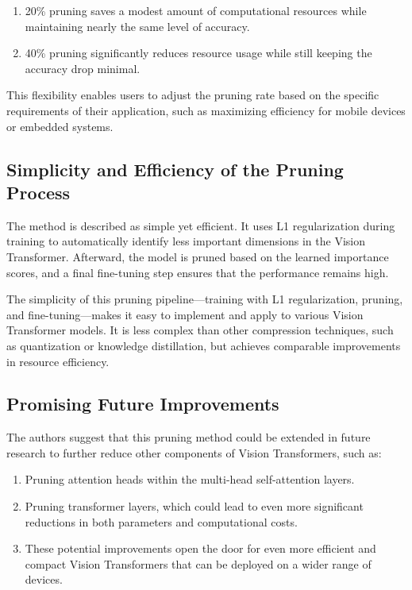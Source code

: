 \documentclass{report}
\begin{document}
	
	\begin{enumerate}
		\item 
		20\% pruning saves a modest amount of computational resources while maintaining nearly the same level of accuracy.
		
		\item 
		40\% pruning significantly reduces resource usage while still keeping the accuracy drop minimal.
	\end{enumerate}
	This flexibility enables users to adjust the pruning rate based on the specific requirements of their application, such as maximizing efficiency for mobile devices or embedded systems.
	
	
	
	
	\subsection{Simplicity and Efficiency of the Pruning Process}
	The method is described as simple yet efficient. It uses L1 regularization during training to automatically identify less important dimensions in the Vision Transformer. Afterward, the model is pruned based on the learned importance scores, and a final fine-tuning step ensures that the performance remains high.
	
	The simplicity of this pruning pipeline—training with L1 regularization, pruning, and fine-tuning—makes it easy to implement and apply to various Vision Transformer models. It is less complex than other compression techniques, such as quantization or knowledge distillation, but achieves comparable improvements in resource efficiency.
	
	
	
	
	\subsection{Promising Future Improvements}
	The authors suggest that this pruning method could be extended in future research to further reduce other components of Vision Transformers, such as:
	
	\begin{enumerate}
		\item 
		Pruning attention heads within the multi-head self-attention layers.
		
		\item 
		Pruning transformer layers, which could lead to even more significant reductions in both parameters and computational costs.
		
		\item 
		These potential improvements open the door for even more efficient and compact Vision Transformers that can be deployed on a wider range of devices.
	\end{enumerate}
	
\end{document}
